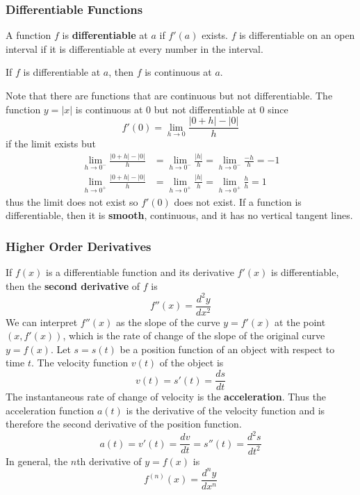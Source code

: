\subsubsection{Differentiable Functions}
\begin{definition}
    A function \(f\) is \textbf{differentiable} at \(a\) if \(f'(a)\) exists.
    \(f\) is differentiable on an open interval if it is differentiable at
    every number in the interval.
\end{definition}
\begin{theorem}
    If \(f\) is differentiable at \(a\), then \(f\) is continuous at \(a\).
\end{theorem}
Note that there are functions that are continuous but not differentiable.
The function \(y=|x|\) is continuous at 0 but not differentiable at 0 since
\[f'(0)=\lim_{h\to 0}\frac{|0+h|-|0|}{h}\] if the limit exists but
\begin{align*}
    \lim_{h\to 0^-}\frac{|0+h|-|0|}{h}&=\lim_{h\to 0^-}\frac{|h|}{h}
    =\lim_{h\to 0^-}\frac{-h}{h}=-1 \\
    \lim_{h\to 0^+}\frac{|0+h|-|0|}{h}&=\lim_{h\to 0^+}\frac{|h|}{h}
    =\lim_{h\to 0^+}\frac{h}{h}=1
\end{align*}
thus the limit does not exist so \(f'(0)\) does not exist.
If a function is differentiable, then it is \textbf{smooth}, continuous, and
it has no vertical tangent lines.

\subsubsection{Higher Order Derivatives}
 If \(f(x)\) is a differentiable function and its derivative \(f'(x)\) is differentiable,
then the \textbf{second derivative} of \(f\) is
\[f''(x)=\frac{d^2y}{dx^2}\]
We can interpret \(f''(x)\) as the slope of the curve \(y=f'(x)\) at the point
\((x,f'(x))\), which is the rate of change of the slope of the original curve \(y=f(x)\).
Let \(s=s(t)\) be a position function of an object with respect to time \(t\).
The velocity function \(v(t)\) of the object is \[v(t)=s'(t)=\frac{ds}{dt}\]
The instantaneous rate of change of velocity is the \textbf{acceleration}.
Thus the acceleration function \(a(t)\) is the derivative of the velocity function and
is therefore the second derivative of the position function.
\[a(t)=v'(t)=\frac{dv}{dt}=s''(t)=\frac{d^2s}{dt^2}\]
In general, the \(n\)th derivative of \(y=f(x)\) is
\[f^{(n)}(x)=\frac{d^ny}{dx^n}\]
